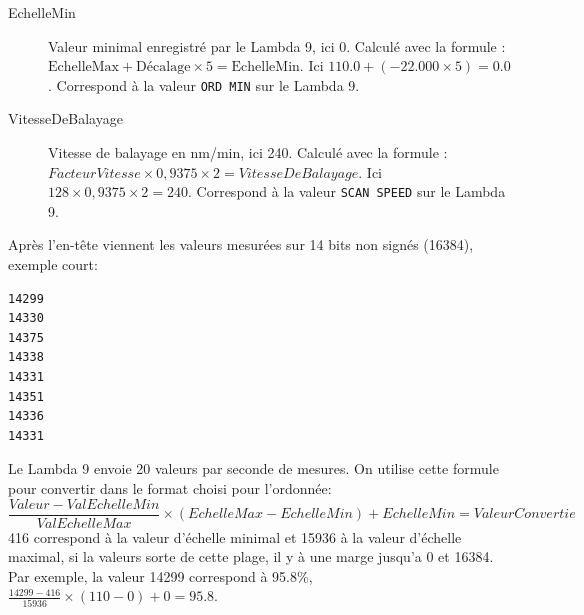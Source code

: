 \documentclass[a4paper, 12pt]{article}
\begin{document}
\begin{description}
	\item[EchelleMin] Valeur minimal enregistré par le Lambda 9, ici 0. Calculé avec la formule : $ \text{EchelleMax} + \text{Décalage} \times 5 = \text{EchelleMin}$. Ici $110.0 + ( -22.000 \times 5 ) = 0.0$. Correspond à la valeur \verb|ORD MIN| sur le Lambda 9.
	\item[VitesseDeBalayage] Vitesse de balayage en nm/min, ici 240. Calculé avec la formule : $FacteurVitesse \times 0,9375 \times 2 = VitesseDeBalayage$. Ici $128 \times 0,9375 \times 2 = 240$. Correspond à la valeur \verb|SCAN SPEED| sur le Lambda 9.

\end{description}

Après l'en-tête viennent les valeurs mesurées sur 14 bits non signés (16384), exemple court:
\begin{lstlisting}
14299
14330
14375
14338
14331
14351
14336
14331
\end{lstlisting}
Le Lambda 9 envoie 20 valeurs par seconde de mesures. %
On utilise cette formule pour convertir dans le format choisi pour l'ordonnée:
\[ \frac{Valeur - ValEchelleMin}{ValEchelleMax} \times (EchelleMax - EchelleMin) + EchelleMin = ValeurConvertie \]
416 correspond à la valeur d'échelle minimal et 15936 à la valeur d'échelle maximal, si la valeurs sorte de cette plage, il y à une marge jusqu'a 0 et 16384.
Par exemple, la valeur 14299 correspond à 95.8\%, $\frac{14299-416}{15936} \times (110-0)+0 = 95.8$.
\end{document}
